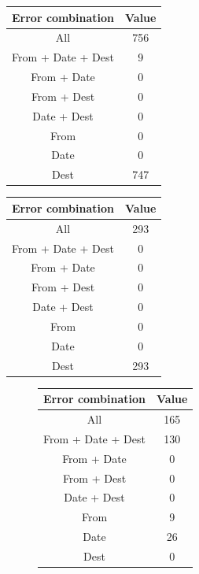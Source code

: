 \documentclass[a4paper,english]{report}
\begin{document}
\bigskip

\begin{center}
 \begin{tabular}{|c | c|}
 \hline
Error combination & Value \\ [0.5ex]
 \hline\hline
All & 756\\
\hline
From + Date + Dest & 9\\
\hline
From + Date & 0\\
\hline
From + Dest & 0\\
\hline
Date + Dest & 0\\
\hline
From & 0\\
\hline
Date & 0\\
\hline
Dest & 747\\
\hline
\end{tabular}
\end{center}



\bigskip


\begin{center}
 \begin{tabular}{|c | c|}
 \hline
Error combination & Value \\ [0.5ex]
 \hline\hline
All & 293\\
\hline
From + Date + Dest & 0\\
\hline
From + Date & 0\\
\hline
From + Dest & 0\\
\hline
Date + Dest & 0\\
\hline
From & 0\\
\hline
Date & 0\\
\hline
Dest & 293\\
\hline
\end{tabular}
\end{center}

\bigskip

\begin{figure}[H]
\begin{center}
 \begin{tabular}{|c | c|}
 \hline
Error combination & Value \\ [0.5ex]
 \hline\hline
All & 165\\
\hline
From + Date + Dest & 130\\
\hline
From + Date & 0\\
\hline
From + Dest & 0\\
\hline
Date + Dest & 0\\
\hline
From & 9\\
\hline
Date & 26\\
\hline
Dest & 0\\
\hline
\end{tabular}
\end{center}
\end{figure}
\end{document}
